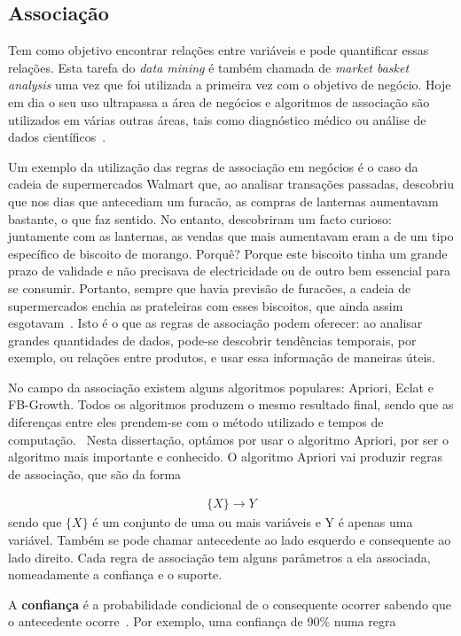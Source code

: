 \subsection{Associação}

Tem como objetivo encontrar relações entre variáveis e pode quantificar essas relações. Esta tarefa do \textit{data mining} é também chamada de \textit{market basket analysis} uma vez que foi utilizada a primeira vez com o objetivo de negócio.\cite{business} Hoje em dia o seu uso ultrapassa a área de negócios e algoritmos de associação são utilizados em várias outras áreas, tais como diagnóstico médico ou análise de dados científicos~\cite{chapter6}.

Um exemplo da utilização das regras de associação em negócios é o caso da cadeia de supermercados Walmart que, ao analisar transações passadas, descobriu que nos dias que antecediam um furacão, as compras de lanternas aumentavam bastante, o que faz sentido. No entanto, descobriram um facto curioso: juntamente com as lanternas, as vendas que mais aumentavam eram a de um tipo específico de biscoito de morango. Porquê? Porque este biscoito tinha um grande prazo de validade e não precisava de electricidade ou de outro bem essencial para se consumir. Portanto, sempre que havia previsão de furacões, a cadeia de supermercados enchia as prateleiras com esses biscoitos, que ainda assim esgotavam~\cite{walmart}.
Isto é o que as regras de associação podem oferecer: ao analisar grandes quantidades de dados, pode-se descobrir tendências temporais, por exemplo, ou relações entre produtos, e usar essa informação de maneiras úteis. 

No campo da associação existem alguns algoritmos populares: Apriori, Eclat e FB-Growth. Todos os algoritmos produzem o mesmo resultado final, sendo que as diferenças entre eles prendem-se com o método utilizado e tempos de computação.~\cite{algs} Nesta dissertação, optámos por usar o algoritmo Apriori, por ser o algoritmo mais importante e conhecido. O algoritmo Apriori vai produzir regras de associação, que são da forma

\begin{align*}
\{X\} \rightarrow Y 
\end{align*}
sendo que $\{X\}$ é um conjunto de uma ou mais variáveis e Y é apenas uma variável. Também se pode chamar antecedente ao lado esquerdo e consequente ao lado direito. Cada regra de associação tem alguns parâmetros a ela associada, nomeadamente a confiança e o suporte.

A \textbf{confiança} é a probabilidade condicional de o consequente ocorrer sabendo que o antecedente ocorre~\cite{oracle}. Por exemplo, uma confiança de 90\% numa regra 

